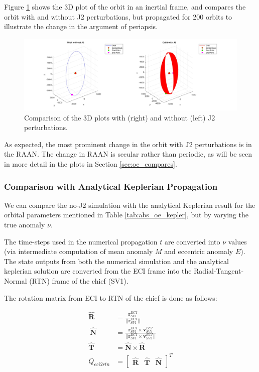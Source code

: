 Figure \ref{fig:3d_plots_with_j2} shows the 3D plot of the orbit in an inertial frame, and compares the orbit with and without J2 perturbations, but propagated for 200 orbits to illustrate the change in the argument of periapsis. 

\begin{figure}[H]
    \centering
    \includegraphics[width=1.1\linewidth]{PS1/Figures/Orbit_J2_Comparison_ECI.jpg}
    \caption{Comparison of the 3D plots with (right) and without (left) J2 perturbations. }
    \label{fig:3d_plots_with_j2}
\end{figure}

As expected, the most prominent change in the orbit with J2 perturbations is in the RAAN. The change in RAAN is secular rather than periodic, as will be seen in more detail in the plots in Section \ref{sec:oe_compares}.

\subsubsection{Comparison with Analytical Keplerian Propagation} \label{sec:analytical_and_eci2rtn}

We can compare the no-J2 simulation with the analytical Keplerian result for the orbital parameters mentioned in Table \ref{tab:abs_oe_kepler}, but by varying the true anomaly $\nu$. 

The time-steps used in the numerical propagation $t$ are converted into $\nu$ values (via intermediate computation of mean anomaly $M$ and eccentric anomaly $E$). The state outputs from both the numerical simulation and the analytical keplerian solution are converted from the ECI frame into the Radial-Tangent-Normal (RTN) frame of the chief (SV1).

The rotation matrix from ECI to RTN of the chief is done as follows:

\begin{align}
    \boldsymbol{\hat{R}} &= \frac{\boldsymbol{r}^{ECI}_{SV1}}{||\boldsymbol{r}^{ECI}_{SV1}||} \\ \
    \boldsymbol{\hat{N}} &= \frac{\boldsymbol{r}^{ECI}_{SV1} \times \boldsymbol{v}^{ECI}_{SV1}}{||\boldsymbol{r}^{ECI}_{SV1} \times \boldsymbol{v}^{ECI}_{SV1}||} \\
    \boldsymbol{\hat{T}} &= \boldsymbol{\hat{N}} \times \boldsymbol{\hat{R}} \\
    Q_{eci2rtn} &= \begin{bmatrix}
        \boldsymbol{\hat{R}} & \boldsymbol{\hat{T}} & \boldsymbol{\hat{N}}
    \end{bmatrix}^T \label{eq:eci2rtn}
\end{align}

